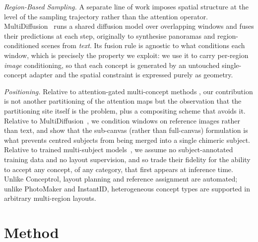 \documentclass[10pt,twocolumn,letterpaper]{article}
\begin{document}
\noindent\textit{Region-Based Sampling.}
A separate line of work imposes spatial structure at the level of the
sampling trajectory rather than the attention operator.
MultiDiffusion~\cite{bartal2023multidiffusion} runs a shared diffusion
model over overlapping windows and fuses their predictions at each
step, originally to synthesise panoramas and region-conditioned scenes
from \emph{text}.  Its fusion rule is agnostic to what conditions each
window, which is precisely the property we exploit: we use it to carry
per-region \emph{image} conditioning, so that each concept is generated
by an untouched single-concept adapter and the spatial constraint is
expressed purely as geometry.

\noindent\textit{Positioning.}
Relative to attention-gated multi-concept methods
\cite{he2025conceptrol,mc2_2025,latexblend2025,freecustom2024,yu2025anyms},
our contribution is not another partitioning of the attention maps but
the observation that the partitioning site itself is the problem, plus
a compositing scheme that avoids it.  Relative to
MultiDiffusion~\cite{bartal2023multidiffusion}, we condition windows on
reference images rather than text, and show that the sub-canvas (rather
than full-canvas) formulation is what prevents centred subjects from
being merged into a single chimeric subject.  Relative to trained
multi-subject models~\cite{xiao2024fastcomposer,wang2025msdiffusion,ma2024subject},
we assume no subject-annotated training data and no layout supervision,
and so trade their fidelity for the ability to accept any concept, of any
category, that first appears at inference time.  Unlike Conceptrol, layout
planning and reference assignment are automated; unlike PhotoMaker and
InstantID, heterogeneous concept types are supported in arbitrary
multi-region layouts.

\section{Method}
\label{sec:method}
\end{document}
